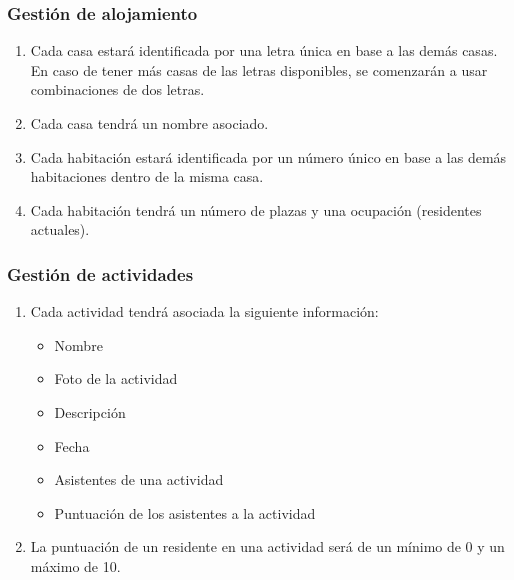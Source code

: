 \subsubsection{Gestión de alojamiento}

\begin{enumerate}[start=15,label={RNF-\arabic*.}]

    \item Cada casa estará identificada por una letra única en base a las demás casas. En caso de tener más casas de las letras disponibles, se comenzarán a usar combinaciones de dos letras.
    \item Cada casa tendrá un nombre asociado.
    \item Cada habitación estará identificada por un número único en base a las demás habitaciones dentro de la misma casa.
    \item Cada habitación tendrá un número de plazas y una ocupación (residentes actuales).

\end{enumerate}

\subsubsection{Gestión de actividades}

\begin{enumerate}[start=18,label={RNF-\arabic*.}]

    \item Cada actividad tendrá asociada la siguiente información:
        \begin{itemize}
            \item Nombre
            \item Foto de la actividad
            \item Descripción
            \item Fecha
            \item Asistentes de una actividad
            \item Puntuación de los asistentes a la actividad
        \end{itemize}
    \item La puntuación de un residente en una actividad será de un mínimo de 0 y un máximo de 10.

\end{enumerate}